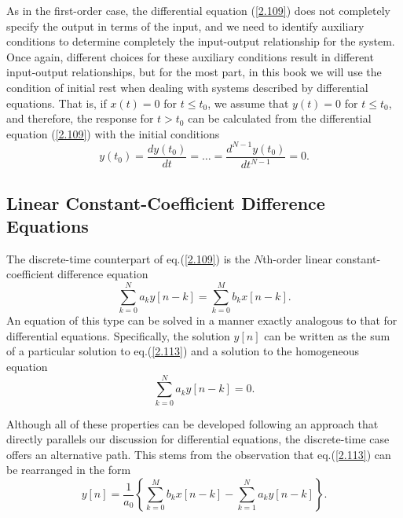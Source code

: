 \documentclass[a4paper,10pt,twoside]{book}
\begin{document}
As in the first-order case, the differential equation (\ref{2.109}) does not completely specify the output in terms of the input, and we need to identify auxiliary conditions to determine completely the input-output relationship for the system. Once again, different choices for these auxiliary conditions result in different input-output relationships, but for the most part, in this book we will use the condition of initial rest when dealing with systems described by differential equations. That is, if $x(t)=0$ for $t\le t_0$, we assume that $y(t)=0$ for $t\le t_0$, and therefore, the response for $t>t_0$ can be calculated from the differential equation (\ref{2.109}) with the initial conditions
\begin{equation}
    y\left(t_0\right)=\frac{dy\left(t_0\right)}{dt}=\ldots=\frac{d^{N-1}y\left(t_0\right)}{dt^{N-1}}=0.
    \label{2.112}
\end{equation}

\subsection{Linear Constant-Coefficient Difference Equations}

The discrete-time counterpart of eq.\;(\ref{2.109}) is the $N$th-order linear constant-coefficient difference equation
\begin{equation}
    \sum_{k=0}^Na_ky[n-k]=\sum_{k=0}^Mb_kx[n-k].
    \label{2.113}
\end{equation}
An equation of this type can be solved in a manner exactly analogous to that for differential equations. Specifically, the solution $y[n]$ can be written as the sum of a particular solution to eq.\;(\ref{2.113}) and a solution to the homogeneous equation
\begin{equation}
    \sum_{k=0}^Na_ky[n-k]=0.
    \label{2.114}
\end{equation}

Although all of these properties can be developed following an approach that directly parallels our discussion for differential equations, the discrete-time case offers an alternative path. This stems from the observation that eq.\;(\ref{2.113}) can be rearranged in the form
\begin{equation}
    y[n] = \frac{1}{a_0}\left\{\sum_{k=0}^Mb_kx[n-k]-\sum_{k=1}^Na_ky[n-k]\right\}.
    \label{2.115}
\end{equation}
\end{document}

